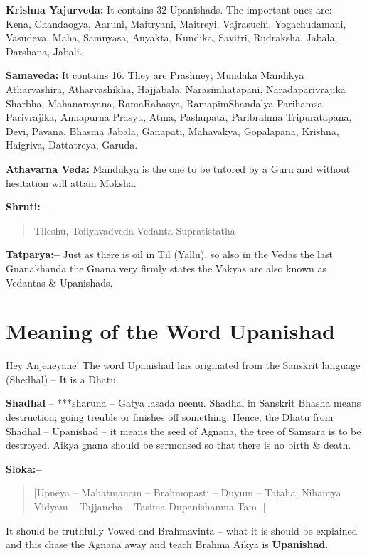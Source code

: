 \textbf{Krishna Yajurveda:} It contains 32 Upanishads. The important ones are:– Kena, Chandaogya, Aaruni, Maitryani, Maitreyi, Vajrasuchi, Yogachudamani, Vasudeva, Maha, Samnyasa, Auyakta, Kundika, Savitri, Rudraksha, Jabala, Darshana, Jabali.

\textbf{Samaveda:} It contains 16. They are Prashney; Mundaka Mandikya Atharvashira, Atharvashikha, Hajjabala, Narasimhatapani, Naradaparivrajika Sharbha, Mahanarayana, RamaRahasya, RamapimShandalya Parihamsa Parivrajika, Annapurna Prasyu, Atma, Pashupata, Paribrahma Tripuratapana, Devi, Pavana, Bhasma Jabala, Ganapati, Mahavakya, Gopalapana, Krishna, Haigriva, Dattatreya, Garuda.

\textbf{Athavarna Veda:} Mandukya is the one to be tutored by a Guru and without hesitation will attain Moksha.

\textbf{Shruti:–}

\begin{verse}
Tileshu, Toilyavadveda Vedanta Supratistatha 
\end{verse}

\textbf{Tatparya:–} Just as there is oil in Til (Yallu), so also in the Vedas the last Gnanakhanda the Gnana very firmly states the Vakyas are also known as Vedantas \& Upanishads.

\chapter{Meaning of the Word Upanishad}

Hey Anjeneyane! The word Upanishad has originated from the Sanskrit language (Shedhal) – It is a Dhatu.

\textbf{Shadhal} – ***sharuna – Gatya lasada neenu. Shadhal in Sanskrit Bhasha means destruction; going treuble or finishes off something. Hence, the Dhatu from Shadhal – Upanishad – it means the seed of Agnana, the tree of Samsara is to be destroyed. Aikya gnana should be sermonsed so that there is no birth \& death.

\textbf{Sloka:–}

\begin{verse}
[Upneya – Mahatmanam – Brahmopasti – Duyum – Tataha: Nihantya Vidyam – Tajjancha – Tasima Dupanishanma Tam .]
\end{verse}

It should be truthfully Vowed and Brahmavinta – what it is should be explained and this chase the Agnana away and teach Brahma Aikya is \textbf{Upanishad}.

